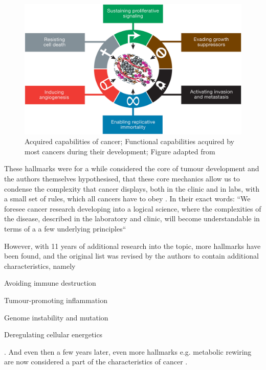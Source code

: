\begin{figure}[!ht]
\centering
\includegraphics[width=.95\linewidth]{Figures/oldHallmarksCancer.jpg}
\caption[Original hallmarks of cancer]{Acquired capabilities of cancer; Functional capabilities acquired by most cancers during their development; Figure adapted from \protect\citeauthor*{Hanahan2000}\protect\cite{Hanahan2000}}\label{fig:oldhallmarks}
\end{figure}


These hallmarks were for a while considered the core of tumour development and the authors themselves hypothesised, that these core mechanics allow us to condense the complexity that cancer displays, both in the clinic and in labs, with a small set of rules, which all cancers have to obey \cite{Hanahan2000}. In their exact words: ``We foresee cancer research developing into a logical science, where the complexities of the disease, described in the laboratory and clinic, will become understandable in terms of a a few underlying principles``

However, with 11 years of additional research into the topic, more hallmarks have been found, and the original list was revised by the authors to contain additional characteristics, namely 
\begin{enumerate*}
\item Avoiding immune destruction
\item Tumour-promoting inflammation
\item Genome instability and mutation
\item Deregulating cellular energetics
\end{enumerate*} \cite{Hanahan2011}. And even then a few years later, even more hallmarks e.g. metabolic rewiring are now considered a part of the characteristics of cancer \cite{Fouad2017}.


